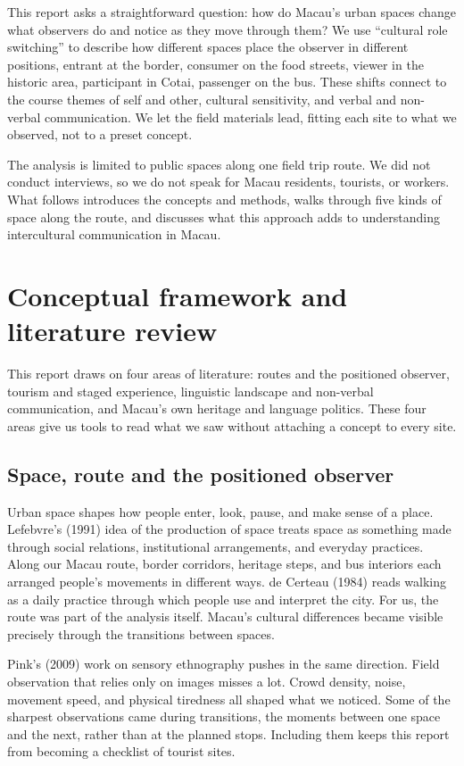 \documentclass[12pt,a4paper]{article}
\begin{document}
This report asks a straightforward question: how do Macau's urban spaces change what observers do and notice as they move through them? We use ``cultural role switching'' to describe how different spaces place the observer in different positions, entrant at the border, consumer on the food streets, viewer in the historic area, participant in Cotai, passenger on the bus. These shifts connect to the course themes of self and other, cultural sensitivity, and verbal and non-verbal communication. We let the field materials lead, fitting each site to what we observed, not to a preset concept.

The analysis is limited to public spaces along one field trip route. We did not conduct interviews, so we do not speak for Macau residents, tourists, or workers. What follows introduces the concepts and methods, walks through five kinds of space along the route, and discusses what this approach adds to understanding intercultural communication in Macau.

\section{Conceptual framework and literature review}

This report draws on four areas of literature: routes and the positioned observer, tourism and staged experience, linguistic landscape and non-verbal communication, and Macau's own heritage and language politics. These four areas give us tools to read what we saw without attaching a concept to every site.

\subsection{Space, route and the positioned observer}

Urban space shapes how people enter, look, pause, and make sense of a place. Lefebvre's (1991) idea of the production of space treats space as something made through social relations, institutional arrangements, and everyday practices. Along our Macau route, border corridors, heritage steps, and bus interiors each arranged people's movements in different ways. de Certeau (1984) reads walking as a daily practice through which people use and interpret the city. For us, the route was part of the analysis itself. Macau's cultural differences became visible precisely through the transitions between spaces.

Pink's (2009) work on sensory ethnography pushes in the same direction. Field observation that relies only on images misses a lot. Crowd density, noise, movement speed, and physical tiredness all shaped what we noticed. Some of the sharpest observations came during transitions, the moments between one space and the next, rather than at the planned stops. Including them keeps this report from becoming a checklist of tourist sites.
\end{document}
